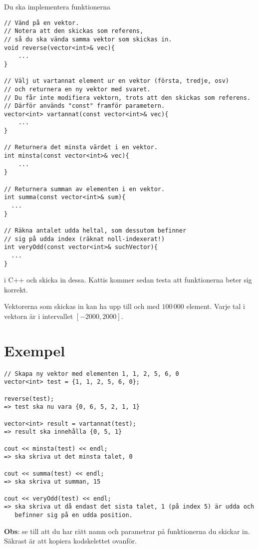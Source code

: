 
Du ska implementera funktionerna

\begin{verbatim}
// Vänd på en vektor.
// Notera att den skickas som referens, 
// så du ska vända samma vektor som skickas in.
void reverse(vector<int>& vec){
	...
}

// Välj ut vartannat element ur en vektor (första, tredje, osv)
// och returnera en ny vektor med svaret.
// Du får inte modifiera vektorn, trots att den skickas som referens.
// Därför används "const" framför parametern.
vector<int> vartannat(const vector<int>& vec){
	...
}

// Returnera det minsta värdet i en vektor.
int minsta(const vector<int>& vec){
	...
}

// Returnera summan av elementen i en vektor.
int summa(const vector<int>& sum){
  ...
}

// Räkna antalet udda heltal, som dessutom befinner
// sig på udda index (räknat noll-indexerat!)
int veryOdd(const vector<int>& suchVector){
  ...
}
\end{verbatim}

i C++ och skicka in dessa. Kattis kommer sedan testa att funktionerna beter sig korrekt.

Vektorerna som skickas in kan ha upp till och med $100\,000$ element. Varje tal i vektorn är i intervallet $[-2000, 2000]$.

\section*{Exempel}
\begin{verbatim}
// Skapa ny vektor med elementen 1, 1, 2, 5, 6, 0
vector<int> test = {1, 1, 2, 5, 6, 0};

reverse(test);
=> test ska nu vara {0, 6, 5, 2, 1, 1}

vector<int> result = vartannat(test);
=> result ska innehålla {0, 5, 1}

cout << minsta(test) << endl;
=> ska skriva ut det minsta talet, 0

cout << summa(test) << endl;
=> ska skriva ut summan, 15

cout << veryOdd(test) << endl;
=> ska skriva ut då endast det sista talet, 1 (på index 5) är udda och 
   befinner sig på en udda position.
\end{verbatim}

\textbf{Obs}: se till att du har rätt namn och parametrar på funktionerna du skickar in. Säkrast är att kopiera kodskelettet ovanför.

